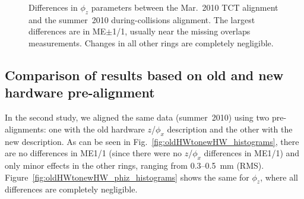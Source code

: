 \documentclass[12pt]{article}
\begin{document}
\begin{figure}
\caption{Differences in $\phi_z$ parameters between the Mar.~2010 TCT
  alignment and the summer~2010 during-collisions alignment.  The
  largest differences are in ME$\pm$1/1, usually near the missing
  overlaps measurements.  Changes in all other rings are completely
  negligible. \label{fig:TCTtoCollisions_phiz_histograms}}
\end{figure}

\subsection{Comparison of results based on old and new hardware pre-alignment}

In the second study, we aligned the same data (summer~2010) using two
pre-alignments: one with the old hardware $z$/$\phi_x$ description and
the other with the new description.  As can be seen in
Fig.~\ref{fig:oldHWtonewHW_histograms}, there are no differences in
ME1/1 (since there were no $z$/$\phi_x$ differences in ME1/1) and only
minor effects in the other rings, ranging from 0.3--0.5~mm (RMS).
Figure~\ref{fig:oldHWtonewHW_phiz_histograms} shows the same for
$\phi_z$, where all differences are completely negligible.
\end{document}
